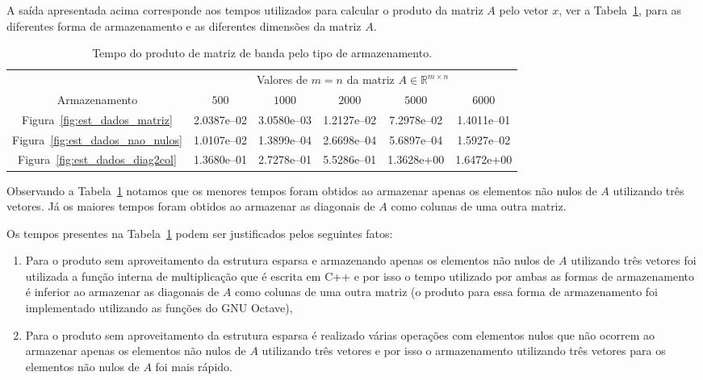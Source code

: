 \documentclass[12pt,a4paper]{article}
\begin{document}
A sa\'{i}da apresentada acima corresponde aos tempos utilizados para calcular o produto da matriz $A$ pelo vetor $x$, ver a Tabela~\ref{tab:tempo_prod}, para as diferentes forma de armazenamento e as diferentes dimensões da matriz $A$.
\begin{table}[!htb]
    \centering
    \caption{Tempo do produto de matriz de banda pelo tipo de armazenamento.}
    \label{tab:tempo_prod}
    \begin{tabular}{|c|c|c|c|c|c|}
        \hline
        & \multicolumn{5}{|c|}{Valores de $m = n$ da matriz $A \in \mathbb{R}^{m \times n}$} \\ \cline{2-6}
        Armazenamento & $500$ & $1000$ & $2000$ & $5000$ & $6000$ \\ \hline
        Figura~\ref{fig:est_dados_matriz} & 2.0387e--02 & 3.0580e--03 & 1.2127e--02 & 7.2978e--02 & 1.4011e--01 \\ \hline
        Figura~\ref{fig:est_dados_nao_nulos} & 1.0107e--02 & 1.3899e--04 & 2.6698e--04 & 5.6897e--04 & 1.5927e--02 \\ \hline
        Figura~\ref{fig:est_dados_diag2col} & 1.3680e--01 & 2.7278e--01 & 5.5286e--01 & 1.3628e+00 & 1.6472e+00 \\ \hline
    \end{tabular}
\end{table}

Observando a Tabela~\ref{tab:tempo_prod} notamos que os menores tempos foram obtidos ao armazenar apenas os elementos não nulos de $A$ utilizando três vetores. Já os maiores tempos foram obtidos ao armazenar as diagonais de $A$ como colunas de uma outra matriz.

Os tempos presentes na Tabela~\ref{tab:tempo_prod} podem ser justificados pelos seguintes fatos:
\begin{enumerate}
    \item Para o produto sem aproveitamento da estrutura esparsa e armazenando apenas os elementos não nulos de $A$ utilizando três vetores foi utilizada a função interna de multiplicação que é escrita em C++ e por isso o tempo utilizado por ambas as formas de armazenamento é inferior ao armazenar as diagonais de $A$ como colunas de uma outra matriz (o produto para essa forma de armazenamento foi implementado utilizando as funções do GNU Octave),
    \item Para o produto sem aproveitamento da estrutura esparsa é realizado várias operações com elementos nulos que não ocorrem ao armazenar apenas os elementos não nulos de $A$ utilizando três vetores e por isso o armazenamento utilizando três vetores para os elementos não nulos de $A$ foi mais rápido.
\end{enumerate}
\end{document}
